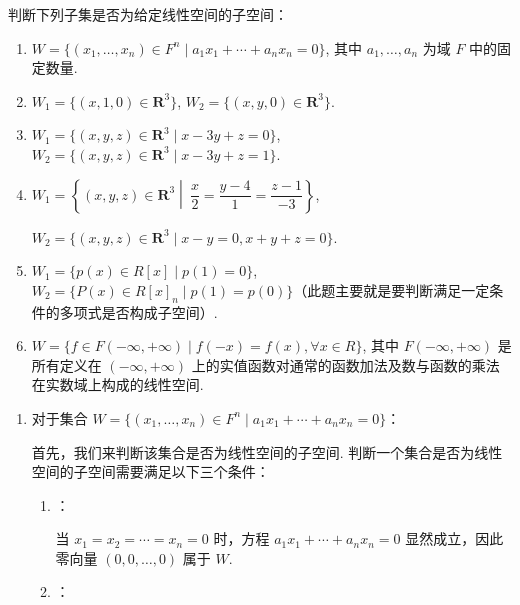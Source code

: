\begin{exercise}
\begin{exgroup}
        \item 判断下列子集是否为给定线性空间的子空间：
        \begin{enumerate}
            \item $W = \{(x_1,\ldots,x_n) \in F^n \mid a_1 x_1+\cdots +a_n x_n =0\}$, 其中 $a_1, \ldots, a_n$ 为域 $F$ 中的固定数量.

            \item $W_1 = \{(x,1,0) \in \mathbf{R}^3 \}$, $W_2 = \{(x,y,0) \in \mathbf{R}^3\}$.

            \item $W_1 = \{(x,y,z) \in \mathbf{R}^3 \mid x-3y+z = 0\}$, $W_2 = \{(x,y,z) \in \mathbf{R}^3 \mid x-3y+z = 1\}$.

            \item $W_1 = \left\{(x,y,z) \in \mathbf{R}^3 \middle|\ \dfrac{x}{2} = \dfrac{y-4}{1} = \dfrac{z-1}{-3}\right\}$,

                  $W_2 = \{(x,y,z) \in \mathbf{R}^3 \mid x-y = 0, x+y+z = 0\}$.

            \item $W_1 = \{p(x) \in R[x] \mid p(1) = 0\}$, $W_2 = \{P(x) \in R[x]_n \mid p(1) = p(0)\}$（此题主要就是要判断满足一定条件的多项式是否构成子空间）.

            \item $W = \{f \in F(-\infty, +\infty) \mid f(-x)=f(x), \forall x \in R\}$, 其中 $F(-\infty, +\infty)$ 是所有定义在 $(-\infty, +\infty)$ 上的实值函数对通常的函数加法及数与函数的乘法在实数域上构成的线性空间.
        \end{enumerate}

        \begin{answer}
            \begin{enumerate}
                \item 对于集合 \( W = \{(x_1, \ldots, x_n) \in F^n \mid a_1x_1 + \cdots + a_nx_n = 0\} \)：

                首先，我们来判断该集合是否为线性空间的子空间. 判断一个集合是否为线性空间的子空间需要满足以下三个条件：

                \begin{enumerate}
                    \item {}：

                    当 \( x_1 = x_2 = \cdots = x_n = 0 \) 时，方程 \( a_1x_1 + \cdots + a_nx_n = 0 \) 显然成立，因此零向量 \( (0, 0, \ldots, 0) \) 属于 \( W \).

                    \item {}：


\end{enumerate}
\end{enumerate}
\end{answer}
\end{exgroup}
\end{exercise}

